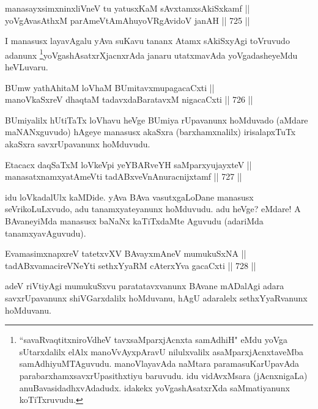 \begin{shl}
manasayxsimxninxliVneV tu yatusxKaM sAvxtamxsAkiSxkamf || \\
yoVgAvasAthxM parAmeVtAmAhuyoVRgAvidoV janAH \hfill || 725 ||  
\end{shl}

\begin{artha} 
I manasusx layavAgalu yAva suKavu tananx Atamx sAkiSxyAgi toVruvudo adanunx \footnote{``savaRvaqtitxniroVdheV tavxsaMparxjAcnxta samAdhiH" eMdu yoVga sUtarxdalilx elAlx manoVvAyxpAravU nilulxvalilx asaMparxjAcnxtaveMba samAdhiyuMTAguvudu. manoVlayavAda naMtara paramasuKarUpavAda parabarxhamxsavxrUpasithxtiyu baruvudu. idu vidAvxMsara (jAcnxnigaLa) anuBavasidadhxvAdadudx. idakekx yoVgashAsatxrXda saMmatiyanunx koTiTxruvudu.}yoVgashAsatxrXjacnxrAda janaru utatxmavAda yoVgadasheyeMdu heVLuvaru.
\end{artha}

\begin{shl}
BUmw yathA\s \s hitaM loVhaM BUmitavxmupagacaCxti || \\
manoV\s kaSxreV dhaqtaM tadavxdaBaratavxM nigacaCxti \hfill || 726 ||  
\end{shl}

\begin{artha} 
BUmiyalilx hUtiTaTx loVhavu heVge BUmiya rUpavanunx hoMduvado (aMdare maNANxguvudo) hAgeye manasusx akaSxra (barxhamxnalilx) irisalapxTuTx akaSxra savxrUpavanunx hoMduvudu.
\end{artha}

\begin{shl}
Etacacx daqSaTxM loVkeV\s pi yeYBARveYH saMparxyujayxteV || \\
manasatxnamxyatAmeVti tadABxveVnAnuracnijxtamf \hfill || 727 ||  
\end{shl}

\begin{artha} 
idu loVkadalUlx kaMDide. yAva BAva vasutxgaLoDane manasusx 
seVrikoLuLxvudo, adu tanamxyateyanunx hoMduvudu. adu heVge? eMdare! A 
BAvaneyiMda manasusx baNaNx kaTiTxdaMte Aguvudu (adariMda 
tanamxyavAguvudu).
\end{artha}

\begin{shl}
EvamasimxnapxreV tatetxvXV BAvayxmAneV mumukuSxNA || \\
tadABxvamacireVNeYti sethxYyaRM cAterxYva gacaCxti \hfill || 728 ||  
\end{shl}

\begin{artha} 
adeV riVtiyAgi mumukuSxvu paratatavxvanunx BAvane mADalAgi adara savxrUpavanunx shiVGarxdalilx hoMduvanu, hAgU adaralelx sethxYyaRvanunx hoMduvanu.
\end{artha}

